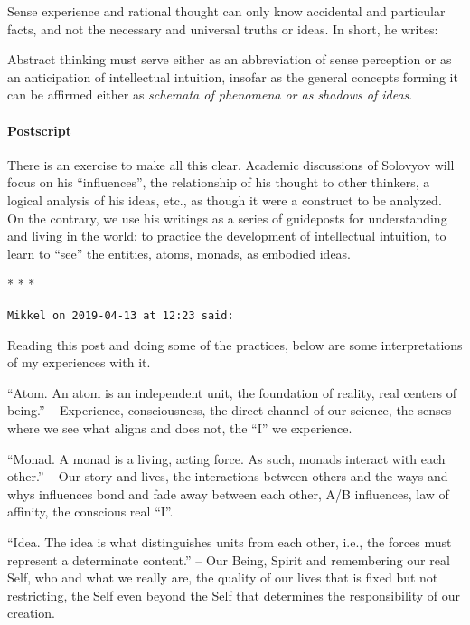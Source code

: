 Sense experience and rational thought can only know accidental and particular facts, and not the necessary and universal truths or ideas. In short, he writes:

\begin{quotex}
Abstract thinking must serve either as an abbreviation of sense perception or as an anticipation of intellectual intuition, insofar as the general concepts forming it can be affirmed either as \emph{schemata of phenomena or as shadows of ideas}.
\end{quotex}


\paragraph{Postscript}


There is an exercise to make all this clear. Academic discussions of Solovyov will focus on his ``influences'', the relationship of his thought to other thinkers, a logical analysis of his ideas, etc., as though it were a construct to be analyzed. On the contrary, we use his writings as a series of guideposts for understanding and living in the world: to practice the development of intellectual intuition, to learn to ``see'' the entities, atoms, monads, as embodied ideas.



\begin{center}* * *\end{center}

\begin{footnotesize}
\begin{sffamily}
\texttt{Mikkel on 2019-04-13 at 12:23 said:}

Reading this post and doing some of the practices, below are some interpretations of my experiences with it.

``Atom. An atom is an independent unit, the foundation of reality, real centers of being.'' -- Experience, consciousness, the direct channel of our science, the senses where we see what aligns and does not, the ``I'' we experience.

``Monad. A monad is a living, acting force. As such, monads interact with each other.'' -- Our story and lives, the interactions between others and the ways and whys influences bond and fade away between each other, A/B influences, law of affinity, the conscious real ``I''.

``Idea. The idea is what distinguishes units from each other, i.e., the forces must represent a determinate content.'' -- Our Being, Spirit and remembering our real Self, who and what we really are, the quality of our lives that is fixed but not restricting, the Self even beyond the Self that determines the responsibility of our creation.

\end{sffamily}
\end{footnotesize}

